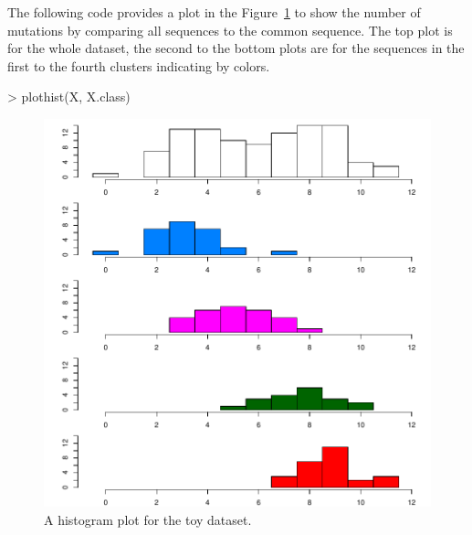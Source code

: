 The following code provides a plot in the Figure~\ref{fig:toyhist}
to show the number of mutations by comparing all sequences to
the common sequence. The top plot is for the whole dataset,
the second to the bottom plots are for the sequences in
the first to the fourth clusters indicating by colors.
\begin{Code}
> plothist(X, X.class)
\end{Code}
\begin{figure}[h]
\begin{center}
\includegraphics[width=5.0in]{./phyclust-graph/toyhist}
\caption{A histogram plot for the toy dataset.}
\label{fig:toyhist}
\end{center}
\end{figure}

